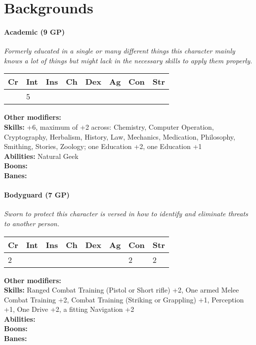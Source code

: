 	\section{Backgrounds}
\label{sec:backgroundlist}
\paragraph*{Academic (9 GP)}
\textit{Formerly educated in a single or many different things this character mainly knows a lot of things but might lack in the necessary skills to apply them properly.}\par
\begin{tabular}{|l|l|l|l|l|l|l|l|}
	\hline
	Cr & Int & Ins & Ch & Dex & Ag & Con & Str \\ \hline
	& 5 &  &  &  &  &  &  \\ \hline
\end{tabular}\par
\noindent\textbf{Other modifiers:} \\
\textbf{Skills:} +6, maximum of +2 across: Chemistry, Computer Operation, Cryptography, Herbalism, History, Law, Mechanics, Medication, Philosophy, Smithing, Stories, Zoology;
one Education +2,
one Education +1\\
\textbf{Abilities:} Natural Geek\\
\textbf{Boons:} \\
\textbf{Banes:} \\

\hrulefill
\paragraph*{Bodyguard (7 GP)}
\textit{Sworn to protect this character is versed in how to identify and eliminate threats to another person.}\par
\begin{tabular}{|l|l|l|l|l|l|l|l|}
	\hline
	Cr & Int & Ins & Ch & Dex & Ag & Con & Str \\ \hline
	2 &  &  &  &  &  & 2 & 2 \\ \hline
\end{tabular}\par
\noindent\textbf{Other modifiers:} \\
\textbf{Skills:} Ranged Combat Training (Pistol or Short rifle) +2,
One armed Melee Combat Training +2,
Combat Training (Striking or Grappling) +1,
Perception +1,
One Drive +2,
a fitting Navigation +2\\
\textbf{Abilities:} \\
\textbf{Boons:} \\
\textbf{Banes:} \\

